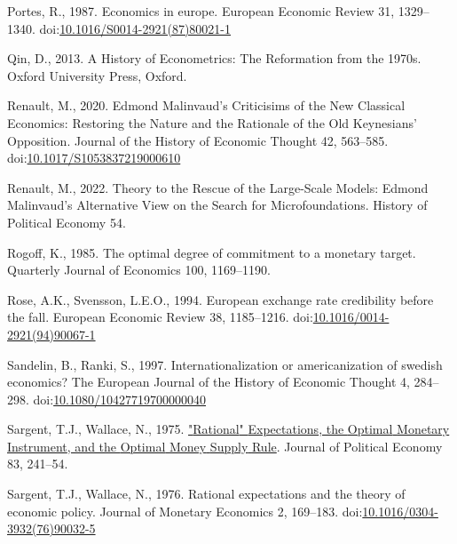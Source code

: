 \documentclass[]{elsarticle} %
\newlength{\cslhangindent}
\newlength{\cslentryspacingunit} %
\newenvironment{CSLReferences}[2] %
 {%
  \setlength{\parindent}{0pt}
  \ifodd #1
  \let\oldpar\par
  \def\par{\hangindent=\cslhangindent\oldpar}
  \fi
  \setlength{\parskip}{#2\cslentryspacingunit}
 }%
 {}
\begin{document}
\begin{CSLReferences}{1}{0}
\leavevmode{}%
Portes, R., 1987. Economics in europe. European Economic Review 31,
1329--1340.
doi:\href{https://doi.org/10.1016/S0014-2921(87)80021-1}{10.1016/S0014-2921(87)80021-1}

\leavevmode{}%
Qin, D., 2013. {A History of Econometrics: The Reformation from the
1970s}. {Oxford University Press}, {Oxford}.

\leavevmode{}%
Renault, M., 2020. Edmond {Malinvaud}'s {Criticisims} of the {New
Classical Economics}: {Restoring} the {Nature} and the {Rationale} of
the {Old Keynesians}' {Opposition}. Journal of the History of Economic
Thought 42, 563--585.
doi:\href{https://doi.org/10.1017/S1053837219000610}{10.1017/S1053837219000610}

\leavevmode{}%
Renault, M., 2022. Theory to the {Rescue} of the {Large-Scale Models}:
{Edmond Malinvaud}'s {Alternative View} on the {Search} for
{Microfoundations}. History of Political Economy 54.

\leavevmode{}%
Rogoff, K., 1985. The optimal degree of commitment to a monetary target.
Quarterly Journal of Economics 100, 1169--1190.

\leavevmode{}%
Rose, A.K., Svensson, L.E.O., 1994. European exchange rate credibility
before the fall. European Economic Review 38, 1185--1216.
doi:\href{https://doi.org/10.1016/0014-2921(94)90067-1}{10.1016/0014-2921(94)90067-1}

\leavevmode{}%
Sandelin, B., Ranki, S., 1997. Internationalization or americanization
of swedish economics? The European Journal of the History of Economic
Thought 4, 284--298.
doi:\href{https://doi.org/10.1080/10427719700000040}{10.1080/10427719700000040}

\leavevmode{}%
Sargent, T.J., Wallace, N., 1975.
\href{http://econpapers.repec.org/article/ucpjpolec/v_3A83_3Ay_3A1975_3Ai_3A2_3Ap_3A241-54.htm}{"{Rational}"
{Expectations}, the {Optimal} {Monetary} {Instrument}, and the {Optimal}
{Money} {Supply} {Rule}}. Journal of Political Economy 83, 241--54.

\leavevmode{}%
Sargent, T.J., Wallace, N., 1976. Rational expectations and the theory
of economic policy. Journal of Monetary Economics 2, 169--183.
doi:\href{https://doi.org/10.1016/0304-3932(76)90032-5}{10.1016/0304-3932(76)90032-5}


\end{CSLReferences}
\end{document}
